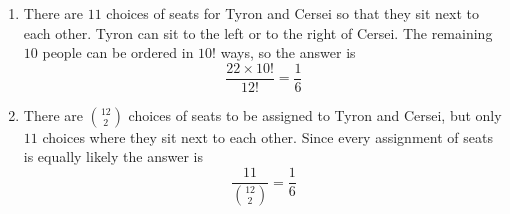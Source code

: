 \begin{enumerate}[label=(\alph*)]
\item  There are $11$ choices of seats for Tyron and Cersei so that they sit next to each other. Tyron can sit to the left or to the right of Cersei. The remaining $10$ people can be ordered in $10!$ ways, so the answer is
$$\frac{22\times10!}{12!} = \frac{1}{6}$$

\item There are $\binom{12}{2}$ choices of seats to be assigned to Tyron and Cersei, but only $11$ choices where they sit next to each other. Since every assignment of seats is equally likely the answer is
$$\frac{11}{\binom{12}{2}} = \frac{1}{6}$$

\end{enumerate}